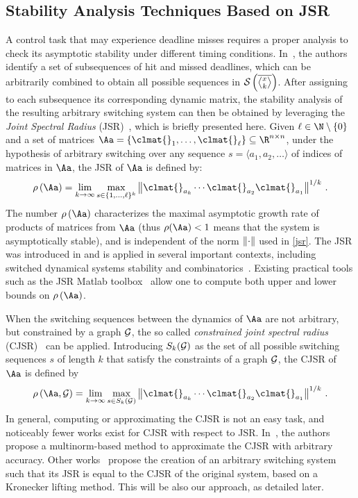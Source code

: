 \subsection{Stability Analysis Techniques Based on JSR}
\label{sec:existing}
A control task that may experience deadline misses requires a proper analysis to check its asymptotic stability under different timing conditions. 
In~\cite{Maggio:2020}, the authors identify a set of subsequences of hit and missed deadlines, which can be arbitrarily combined to obtain all possible sequences in $\sset{}{\rowmiss{}}$.
After assigning to each subsequence its corresponding dynamic matrix, the stability analysis of the resulting arbitrary switching system can then be obtained by leveraging the \emph{Joint Spectral Radius} (JSR)~\cite{Jungers2009}, which is briefly presented here.
%
Given $\ell\in\N\setminus \left\{ 0 \right\} $ and a set of matrices $\Aa = \{\clmat{}_1, \ldots, \clmat{}_\ell \} \subseteq \R^{n\times n}$, under the hypothesis of arbitrary switching over any sequence $s=\langle a_1,a_2,\dots \rangle$ of indices of matrices in $\Aa$, the JSR of $\Aa$ is defined by:
\begin{equation}
    \label{jsr}
    \rho\left(\Aa\right)= \lim_{k\rightarrow\infty} \max_{s\in\{1,\ldots,\ell\}^k} \norm{\clmat{}_{a_k} \cdots \clmat{}_{a_2}\clmat{}_{a_1}}^{1/k} \,.
\end{equation}
The number $\rho\left(\Aa\right)$ characterizes the maximal asymptotic growth rate of products of matrices from $\Aa$ (thus  $\rho(\Aa)<1$ means that the system is asymptotically stable), and is independent of the norm $\left\lVert\cdot\right\rVert$ used in \eqref{jsr}.
%
The JSR was introduced in \cite{rota} and is applied in several important contexts, including switched dynamical systems stability and combinatorics~\cite{Jungers2009}.
Existing practical tools such as the JSR Matlab toolbox~\cite{vankeerberghen2014jsr} allow one to compute both upper and lower bounds on $\rho\left(\Aa\right)$.

When the switching sequences between the dynamics of $\Aa$ are not arbitrary, but constrained by a graph $\mathcal{G}_{}$, the so called \emph{constrained joint spectral radius} (CJSR)~\cite{dai2012gelfand} can be applied.
Introducing ${S}_k(\mathcal{G}_{})$ as the set of all possible switching sequences $s$ of length $k$ that satisfy the constraints of a graph $\mathcal{G}_{}$, the CJSR of $\Aa$ is defined by
\begin{equation}
\label{cjsr}
    \rho\left(\Aa,\GG{}\right)= \lim_{k\rightarrow\infty} \max_{s\in{S}_k(\GG{})} \norm{\clmat{}_{a_k} \cdots \clmat{}_{a_2}\clmat{}_{a_1}}^{1/k} \,.
\end{equation}
In general, computing or approximating the CJSR is not an easy task, and noticeably fewer works exist for CJSR with respect to JSR.
In~\cite{philippe2016stability}, the authors propose a multinorm-based method to approximate the CJSR with arbitrary accuracy.
Other works~\cite{kozyakin2014berger, wang2014stability, xu2020approximation} propose the creation of an arbitrary switching system such that its JSR is equal to the CJSR of the original system, based on a Kronecker lifting method.
This will be also our approach, as detailed later.

